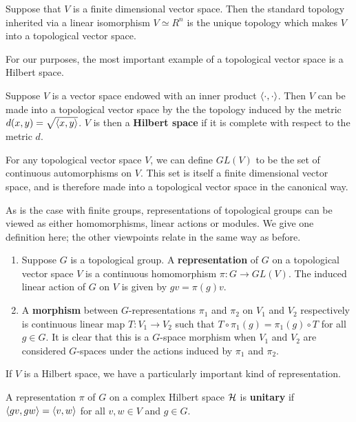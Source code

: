 \documentclass[a4paper]{article}
\begin{document}
\begin{eg}
    Suppose that $V$ is a finite dimensional vector space. Then the standard topology inherited via a linear isomorphism $V \simeq R^n$ is the unique topology which makes $V$ into a topological vector space. \cite{alex}
\end{eg}

For our purposes, the most important example of a topological vector space is a Hilbert space.

\begin{defi}
    Suppose $V$ is a vector space endowed with an inner product $\left\langle \cdot , \cdot \right\rangle$. Then $V$ can be made into a topological vector space by the the topology induced by the metric $d(x, y) = \sqrt{\left\langle x , y \right\rangle}$. $V$ is then a \textbf{Hilbert space} if it is complete with respect to the metric $d$. 
\end{defi}

For any topological vector space $V$, we can define $GL(V)$ to be the set of continuous automorphisms on $V$. This set is itself a finite dimensional vector space, and is therefore made into a topological vector space in the canonical way.

As is the case with finite groups, representations of topological groups can be viewed as either homomorphisms, linear actions or modules. We give one definition here; the other viewpoints relate in the same way as before.

\begin{defi}[G-representation]\end{defi}
\begin{enumerate}
    \item Suppose $G$ is a topological group. A \textbf{representation} of $G$ on a topological vector space $V$ is a continuous homomorphism $\pi: G \to GL(V)$. The induced linear action of $G$ on $V$ is given by $gv = \pi(g)v$.
    \item A \textbf{morphism} between $G$-representations $\pi_1$ and $\pi_2$ on $V_1$ and $V_2$ respectively is continuous linear map $T: V_1 \to V_2$ such that $T \circ \pi_1(g) = \pi_1(g) \circ T$ for all $g\in G$. It is clear that this is a $G$-space morphism when $V_1$ and $V_2$ are considered $G$-spaces under the actions induced by $\pi_1$ and $\pi_2$.
\end{enumerate}

If $V$ is a Hilbert space, we have a particularly important kind of representation.

\begin{defi}
    A representation $\pi$ of $G$ on a complex Hilbert space $\mathcal{H}$ is \textbf{unitary} if $\left\langle gv , gw \right\rangle = \left\langle v , w \right\rangle$ for all $v, w \in V$ and $g \in G$.
\end{defi}
\end{document}
